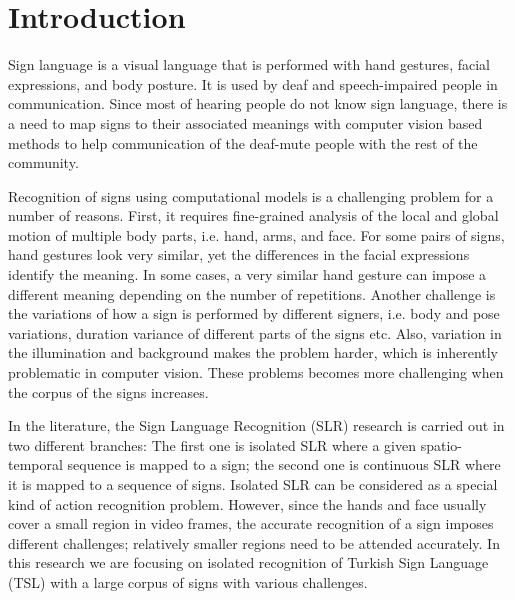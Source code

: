 \documentclass[11pt, a4paper, singlecolumn]{article}
\begin{document}
\section{Introduction}

Sign language is a visual language that is performed with hand gestures, facial expressions, and body posture. It is used by deaf and speech-impaired people in communication. Since most of hearing people do not know sign language, there is a need to map signs to their associated meanings with computer vision based methods to help communication of the deaf-mute people with the rest of the community. 

Recognition of signs using computational models is a challenging problem for a number of reasons. First, it requires fine-grained analysis of the local and global motion of multiple body parts, i.e. hand, arms, and face. For some pairs of signs, hand gestures look very similar, yet the differences in the facial expressions identify the meaning. In some cases, a very similar hand gesture can impose a different meaning depending on the number of repetitions. Another challenge is the variations of how a sign is performed by different signers, i.e. body and pose variations, duration variance of different parts of the signs etc. Also, variation in the illumination and background makes the problem harder, which is inherently problematic in computer vision. These problems becomes more challenging when the corpus of the signs increases. 

In the literature, the Sign Language Recognition (SLR) research is carried out in two different branches: The first one is isolated SLR \cite{sincan2019isolated, huang2018attention, li2020word, pigou2018beyond, neverova2015moddrop} where a given spatio-temporal sequence is mapped to a sign; the second one is continuous SLR \cite{huang2018video, cui2019deep, guo2018hierarchical, pu2019iterative,koller2018deep} where it is mapped to a sequence of signs. Isolated SLR can be considered as a special kind of action recognition problem.  However, since the hands and face usually cover a small region in video frames, the accurate recognition of a sign imposes different challenges; relatively smaller regions need to be attended accurately. In this research we are focusing on isolated recognition of Turkish Sign Language (TSL) with a large corpus of signs with various challenges. 
\end{document}
